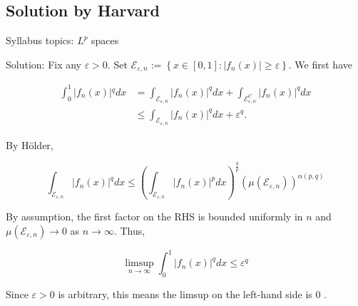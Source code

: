 \documentclass{article}
\begin{document}
\subsection{Solution by Harvard}

Syllabus topics: $L^{p}$ spaces

Solution: Fix any $\varepsilon>0$. Set $\mathcal{E}_{\varepsilon, n}:=\left\{x \in[0,1]:\left|f_{n}(x)\right| \geq \varepsilon\right\}$. We first have

$$
\begin{aligned}
\int_{0}^{1}\left|f_{n}(x)\right|{ }^{q} d x & =\int_{\mathcal{E}_{\varepsilon, n}}\left|f_{n}(x)\right|^{q} d x+\int_{\mathcal{E}_{\varepsilon, n}^{C}}\left|f_{n}(x)\right|^{q} d x \\
& \leq \int_{\mathcal{E}_{\varepsilon, n}}\left|f_{n}(x)\right|^{q} d x+\varepsilon^{q} .
\end{aligned}
$$

By Hölder,

$$
\int_{\mathcal{E}_{\varepsilon, n}}\left|f_{n}(x)\right|^{q} d x \leq\left(\int_{\mathcal{E}_{\varepsilon, n}}\left|f_{n}(x)\right|^{p} d x\right)^{\frac{q}{p}}\left(\mu\left(\mathcal{E}_{\varepsilon, n}\right)\right)^{\alpha(p, q)}
$$

By assumption, the first factor on the RHS is bounded uniformly in $n$ and $\mu\left(\mathcal{E}_{\varepsilon, n}\right) \rightarrow 0$ as $n \rightarrow \infty$. Thus,

$$
\limsup _{n \rightarrow \infty} \int_{0}^{1}\left|f_{n}(x)\right|^{q} d x \leq \varepsilon^{q}
$$

Since $\varepsilon>0$ is arbitrary, this means the limsup on the left-hand side is 0 .
\end{document}
